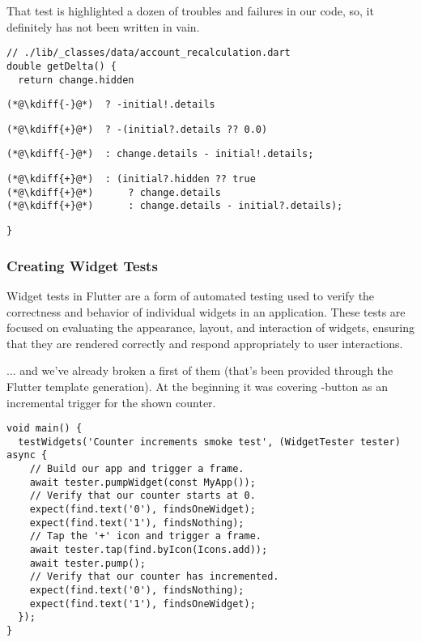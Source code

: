 \noindent That test is highlighted a dozen of troubles and failures in our code, so, it definitely has not been 
written in vain.

\begin{lstlisting}[firstnumber=17]
// ./lib/_classes/data/account_recalculation.dart
double getDelta() {
  return change.hidden
\end{lstlisting}
{
\xpretocmd{\lstlisting}{\vspace{-12pt}}{}{}
\begin{lstlisting}[firstnumber=20, backgroundcolor=\color{backred}]
(*@\kdiff{-}@*)  ? -initial!.details
\end{lstlisting}
\begin{lstlisting}[firstnumber=20, backgroundcolor=\color{backgreen}]
(*@\kdiff{+}@*)  ? -(initial?.details ?? 0.0)
\end{lstlisting}
\begin{lstlisting}[firstnumber=21, backgroundcolor=\color{backred}]
(*@\kdiff{-}@*)  : change.details - initial!.details;
\end{lstlisting}
\begin{lstlisting}[firstnumber=21, backgroundcolor=\color{backgreen}]
(*@\kdiff{+}@*)  : (initial?.hidden ?? true
(*@\kdiff{+}@*)      ? change.details
(*@\kdiff{+}@*)      : change.details - initial?.details);
\end{lstlisting}
\begin{lstlisting}[firstnumber=24]
}
\end{lstlisting}
}


\subsubsection{Creating Widget Tests} \label{widget-tests}

Widget tests in Flutter are a form of automated testing used to verify the correctness and behavior of individual 
widgets in an application. These tests are focused on evaluating the appearance, layout, and interaction of widgets, 
ensuring that they are rendered correctly and respond appropriately to user interactions.

\noindent ... and we've already broken a first of them (that's been provided through the Flutter template generation). 
At the beginning it was covering -button as an incremental trigger for the shown counter.

\begin{lstlisting}
void main() {
  testWidgets('Counter increments smoke test', (WidgetTester tester) async {
    // Build our app and trigger a frame.
    await tester.pumpWidget(const MyApp());
    // Verify that our counter starts at 0.
    expect(find.text('0'), findsOneWidget);
    expect(find.text('1'), findsNothing);
    // Tap the '+' icon and trigger a frame.
    await tester.tap(find.byIcon(Icons.add));
    await tester.pump();
    // Verify that our counter has incremented.
    expect(find.text('0'), findsNothing);
    expect(find.text('1'), findsOneWidget);
  });
}
\end{lstlisting}

